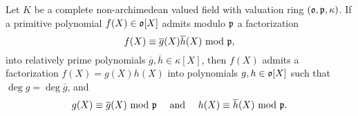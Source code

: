 \begin{lemma}
    Let $K$ be a complete non-archimedean valued field with valuation ring $(\mathfrak{o}, \mathfrak{p},\kappa)$. If a primitive polynomial $f(X)\in\mathfrak{o}[X]$ admits modulo $\mathfrak{p}$ a factorization 
    \begin{equation*}
        f(X)\equiv\overline g(X)\overline h(X)~\mathrm{mod}~\mathfrak{p},
    \end{equation*}
    into relatively prime polynomials $\overline g,\overline h\in\kappa[X]$, then $f(X)$ admits a factorization $f(X) = g(X)h(X)$ into polynomials $g, h\in\mathfrak{o}[X]$ such that $\deg g = \deg\overline g$, and 
    \begin{equation*}
        g(X)\equiv\overline g(X)~\mathrm{mod}~\mathfrak{p}\quad\text{ and }\quad h(X)\equiv\overline{h}(X)~\mathrm{mod}~\mathfrak{p}.
    \end{equation*}
\end{lemma}
